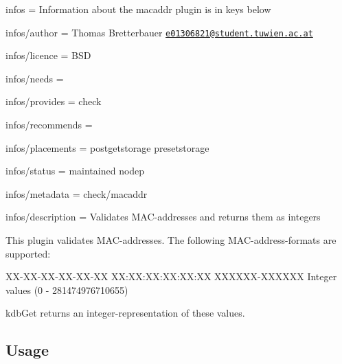 
\begin{DoxyItemize}
\item infos = Information about the macaddr plugin is in keys below
\item infos/author = Thomas Bretterbauer \href{mailto:e01306821@student.tuwien.ac.at}{\tt e01306821@student.\+tuwien.\+ac.\+at}
\item infos/licence = B\+SD
\item infos/needs =
\item infos/provides = check
\item infos/recommends =
\item infos/placements = postgetstorage presetstorage
\item infos/status = maintained nodep
\item infos/metadata = check/macaddr
\item infos/description = Validates M\+A\+C-\/addresses and returns them as integers
\end{DoxyItemize}

This plugin validates M\+A\+C-\/addresses. The following M\+A\+C-\/address-\/formats are supported\+: \begin{DoxyVerb}XX-XX-XX-XX-XX-XX
XX:XX:XX:XX:XX:XX
XXXXXX-XXXXXX
Integer values (0 - 281474976710655)
\end{DoxyVerb}


{\ttfamily kdb\+Get} returns an integer-\/representation of these values.

\subsection*{Usage}


